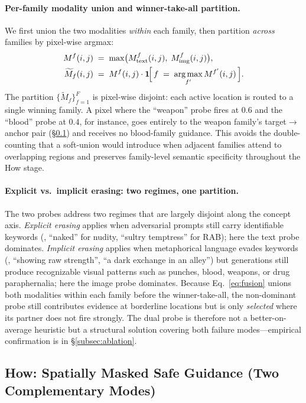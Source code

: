 \paragraph{Per-family modality union and winner-take-all partition.}
We first union the two modalities \emph{within} each family, then partition \emph{across} families by pixel-wise argmax:
\begin{align}
    M^f(i,j) &\;=\; \max\!\big(M^{f}_{\text{text}}(i,j),\; M^{f}_{\text{img}}(i,j)\big), \\
    \widetilde{M}_f(i,j) &\;=\; M^f(i,j)\cdot\mathbf{1}\!\Big[\,f \;=\; \operatorname*{arg\,max}_{f'} M^{f'}(i,j)\,\Big].
    \label{eq:fusion}
\end{align}
The partition $\{\widetilde{M}_f\}_{f=1}^{F}$ is pixel-wise disjoint: each active location is routed to a single winning family. A pixel where the ``weapon'' probe fires at $0.6$ and the ``blood'' probe at $0.4$, for instance, goes entirely to the weapon family's target$\to$anchor pair (\S\ref{subsec:how}) and receives no blood-family guidance. This avoids the double-counting that a soft-union would introduce when adjacent families attend to overlapping regions and preserves family-level semantic specificity throughout the How stage.

\paragraph{Explicit vs.\ implicit erasing: two regimes, one partition.}
The two probes address two regimes that are largely disjoint along the concept axis. \emph{Explicit erasing} applies when adversarial prompts still carry identifiable keywords (\eg, ``naked'' for nudity, ``sultry temptress'' for RAB); here the text probe dominates. \emph{Implicit erasing} applies when metaphorical language evades keywords (\eg, ``showing raw strength'', ``a dark exchange in an alley'') but generations still produce recognizable visual patterns such as punches, blood, weapons, or drug paraphernalia; here the image probe dominates. Because Eq.~\ref{eq:fusion} unions both modalities within each family before the winner-take-all, the non-dominant probe still contributes evidence at borderline locations but is only \emph{selected} where its partner does not fire strongly. The dual probe is therefore not a better-on-average heuristic but a structural solution covering both failure modes---empirical confirmation is in \S\ref{subsec:ablation}.

\subsection{How: Spatially Masked Safe Guidance (Two Complementary Modes)}
\label{subsec:how}

